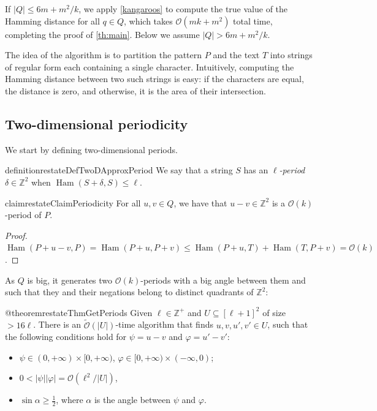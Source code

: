 \documentclass[twoside,leqno]{article}
\newcommand{\Z}{\mathbb{Z}}
\renewcommand{\O}{\mathcal{O}}
\newcommand{\tO}{\tilde{\mathcal{O}}}
\renewcommand{\phi}{\varphi}
\DeclareMathOperator*{\Ham}{Ham}
\newcommand{\absolute}[1]{\left\lvert#1\right\rvert}
\begin{document}
If $\absolute{Q} \le 6m + m^2/k$, we apply \cref{kangaroos} to compute the true value of the Hamming distance for all $q \in Q$, which takes $\O(mk+m^2)$ total time, completing the proof of \cref{th:main}. Below we assume $\absolute{Q} > 6m + m^2/k$. 

The idea of the algorithm is to partition the pattern $P$ and the text $T$ into strings of regular form each containing a single character. Intuitively, computing the Hamming distance between two such strings is easy: if the characters are equal, the distance is zero, and otherwise, it is the area of their intersection.

\subsection{Two-dimensional periodicity}
We start by defining two-dimensional periods.



\begin{restatable*}{definition}{restateDefTwoDApproxPeriod}
We say that a string $S$ has an \emph{$\ell$-period} $\delta \in \Z^2$ when $\Ham(S + \delta, S) \le \ell$.
\end{restatable*}

\begin{restatable*}{claim}{restateClaimPeriodicity} \label{periodicity_lemma}
For all $u, v \in Q$, we have that $u - v \in \Z^2$ is a $\O(k)$-period of $P$.
\end{restatable*}	
\begin{proof}
$\Ham(P + u - v, P) = \Ham(P + u, P + v) \le \Ham(P + u, T) + \Ham(T,P + v) = \O(k)$.
\end{proof}


As $Q$ is big, it generates two $\O(k)$-periods with a big angle between them and such that they and their negations belong to distinct quadrants of $\Z^2$: 

\begin{restatable*}{@theorem}{restateThmGetPeriods}\label{get_periods}
Given $\ell \in \Z^+$ and $U \subseteq [\ell + 1]^2$ of size $> 16\ell$. There is an $\tO(\absolute{U})$-time algorithm that finds $u, v, u', v' \in U$, such that the following conditions hold for $\psi = u - v$ and $\phi = u' - v'$:
	\begin{itemize}
		\item $\psi \in (0, +\infty) \times [0, +\infty)$, $\phi \in [0, +\infty) \times (-\infty, 0)$;
		\item $0 < \absolute{\psi}\absolute{\phi} = \O(\ell^2 / \absolute{U})$,
		\item $\sin \alpha \ge \frac{1}{2}$, where $\alpha$ is the angle between $\psi$ and $\phi$.
	\end{itemize}
\end{restatable*}
\end{document}
